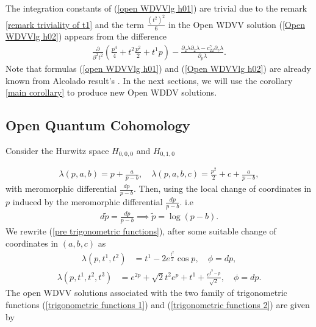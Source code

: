 \documentclass{article}
\theoremstyle{definition}
\begin{document}
The integration constants of (\ref{open WDVVlg h01}) are trivial due to the remark \ref{remark triviality of t1} and the term $\frac{(t^2)^2}{6}$ in the Open WDVV solution (\ref{Open WDVVlg h02}) appears from the difference 
\begin{equation*}
\begin{split}
\frac{ \partial}{\partial^2 t^2}\left( \frac{p^4}{4}+t^2\frac{p^2}{2}+t^1p \right)-\frac{ \partial_{2}\lambda \partial_{2}\lambda-c_{22}^{\gamma}\partial_{\gamma}\lambda}{ \partial_{p}\lambda}.
\end{split}
\end{equation*}
Note that formulas (\ref{open WDVVlg h01}) and (\ref{Open WDVVlg h02}) are already known from Alcolado result's \cite{Alcolado Adam}. In the next sections, we will use the corollary \ref{main corollary} to produce new Open WDDV solutions.

\subsection{Open Quantum Cohomology}

Consider  the Hurwitz space $H_{0,0,0}$  and $H_{0,1,0}$ 

\begin{equation}\label{pre trigonometric functions}
\begin{split}
\lambda(p,a,b)=p+\frac{a}{p-b}, \quad \lambda(p,a,b,c)=\frac{p^2}{2}+c+\frac{a}{p-b},
\end{split}
\end{equation}
with meromorphic differential $\frac{dp}{p-b}$. Then, using the local change of coordinates in $p$ induced by the meromorphic differential $\frac{dp}{p-b}$. i.e
\begin{equation*}
\begin{split}
d\tilde p=\frac{dp}{p-b} \implies \tilde p=\log (p-b).
\end{split}
\end{equation*}
We rewrite (\ref{pre trigonometric functions}), after some suitable change of coordinates in $(a,b,c)$ as 
\begin{equation}\label{trigonometric functions 1}
\begin{split}
\lambda(p,t^1,t^2)&=t^1-2e^{\frac{t^2}{2}}\cos p,\quad \phi=dp,
 \end{split}
\end{equation}
\begin{equation}\label{trigonometric functions 2}
\begin{split}
 \lambda(p,t^1,t^2,t^3)&=e^{2p}+\sqrt{2}t^2e^p+t^1+\frac{e^{t^3-p}}{\sqrt{2}},\quad \phi=dp.
 \end{split}
\end{equation}
The open WDVV solutions associated with the two family of trigonometric functions (\ref{trigonometric functions 1}) and (\ref{trigonometric functions 2}) are given by
\end{document}
